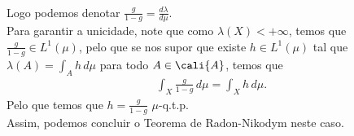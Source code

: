 \begin{homeworkProblem}[7]
\begin{solution}
\begin{enumerate}[a)]
\begin{align*}
      \end{align*}
      Logo podemos denotar $\frac{g}{1-g}=\frac{d\lambda}{d\mu}$.\\
      Para garantir a unicidade, note que como $\lambda(X)<+\infty$, temos que $\frac{g}{1-g}\in L^{1}(\mu)$, pelo que se nos supor que existe $h\in L^{1}(\mu)$ tal que $\lambda(A)=\int_{A}h\,d\mu$ para todo $A\in\cali{A}$, temos que 
      \begin{align*}
        \int_{X}\frac{g}{1-g}\,d\mu=\int_{X}h\,d\mu.
      \end{align*}
      Pelo que temos que $h=\frac{g}{1-g}$ $\mu$-q.t.p.\\ 
      Assim, podemos concluir o Teorema de Radon-Nikodym neste caso.
 \end{enumerate} 
  \end{solution}
\end{homeworkProblem}
